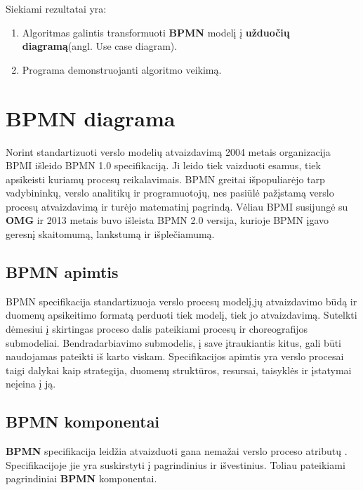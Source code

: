 \documentclass{VUMIFInfBakalaurinis}
\begin{document}
Siekiami rezultatai yra:
\begin{enumerate}
	\item Algoritmas galintis transformuoti \textbf{BPMN} modelį į \textbf{užduočių diagramą}(angl. Use case diagram).
	\item Programa demonstruojanti algoritmo veikimą.
\end{enumerate}


\section{\textbf{BPMN} diagrama}
Norint standartizuoti verslo modelių atvaizdavimą 2004 metais organizacija BPMI išleido BPMN 1.0 specifikaciją. Ji leido tiek vaizduoti esamus, tiek apsikeisti kuriamų procesų reikalavimais. BPMN greitai išpopuliarėjo tarp vadybininkų, verslo analitikų ir programuotojų, nes pasiūlė pažįstamą verslo procesų atvaizdavimą ir turėjo matematinį pagrindą. Vėliau BPMI susijungė su \textbf{OMG} ir 2013 metais buvo išleista BPMN 2.0 versija, kurioje BPMN įgavo geresnį skaitomumą, lankstumą ir išplečiamumą.

\subsection{\textbf{BPMN} apimtis}
BPMN specifikacija standartizuoja verslo procesų modelį,jų atvaizdavimo būdą ir duomenų apsikeitimo formatą perduoti tiek modelį, tiek jo atvaizdavimą. Sutelkti dėmesiui į skirtingas proceso dalis pateikiami procesų ir choreografijos submodeliai. Bendradarbiavimo submodelis, į save įtraukiantis kitus, gali būti naudojamas pateikti iš karto viskam. Specifikacijos apimtis yra verslo procesai taigi dalykai kaip strategija, duomenų struktūros, resursai, taisyklės ir įstatymai neįeina į ją. 
 
\subsection{\textbf{BPMN} komponentai} \label{section:bpmn_components}
\textbf{BPMN} specifikacija leidžia atvaizduoti gana nemažai verslo proceso atributų \cite{bpmnFormal}. Specifikacijoje jie yra suskirstyti į pagrindinius ir išvestinius. Toliau pateikiami pagrindiniai \textbf{BPMN} komponentai.
\end{document}
